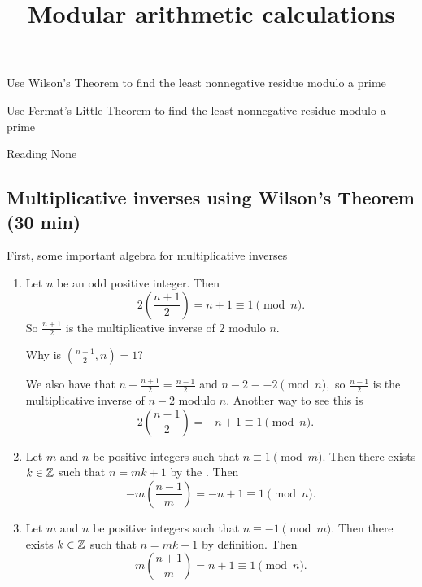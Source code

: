 \documentclass{../ximera}
\title{Modular arithmetic calculations}
\begin{document}
\begin{abstract}
\end{abstract}
\maketitle


\begin{obj}
\item Use Wilson's Theorem to find the least nonnegative residue modulo a prime
\item Use Fermat's Little Theorem to find the least nonnegative residue modulo a prime
\end{obj}


\begin{pre}
    \item[Reading] None
\end{pre}

\subsection{Multiplicative inverses using Wilson's Theorem (30 min)}
First, some important algebra  for multiplicative inverses
\begin{example}
\begin{enumerate}
 \item  Let $n$ be an odd positive integer. Then \[2\left(\frac{n+1}{2}\right)=n+1\equiv 1\pmod{n}.\] So $\frac{n+1}{2}$ is the multiplicative inverse of $2$ modulo $n$. 
\begin{tps}
 Why is $\left(\frac{n+1}{2},n\right)=1$?
\end{tps}

We also have that $n-\frac{n+1}{2}= \frac{n-1}{2}$ and $n-2\equiv -2\pmod{n},$ so $\frac{n-1}{2}$ is the multiplicative inverse of $n-2$ modulo $n.$ Another way to see this is 
\[-2\left(\frac{n-1}{2}\right)=-n+1\equiv 1\pmod{n}.\] 

\item Let $m$ and $n$ be positive integers such that $n\equiv 1\pmod m.$ Then there exists $k\in\mathbb Z$ such that $n=mk+1$ by the . Then 
\[-m\left(\frac{n-1}{m}\right)=-n+1\equiv 1\pmod{n}.\]

\item Let $m$ and $n$ be positive integers such that $n\equiv -1\pmod m.$ Then there exists $k\in\mathbb Z$ such that $n=mk-1$ by definition. Then 
\[m\left(\frac{n+1}{m}\right)=n+1\equiv 1\pmod{n}.\]
\end{enumerate}

\end{example}
\end{document}
